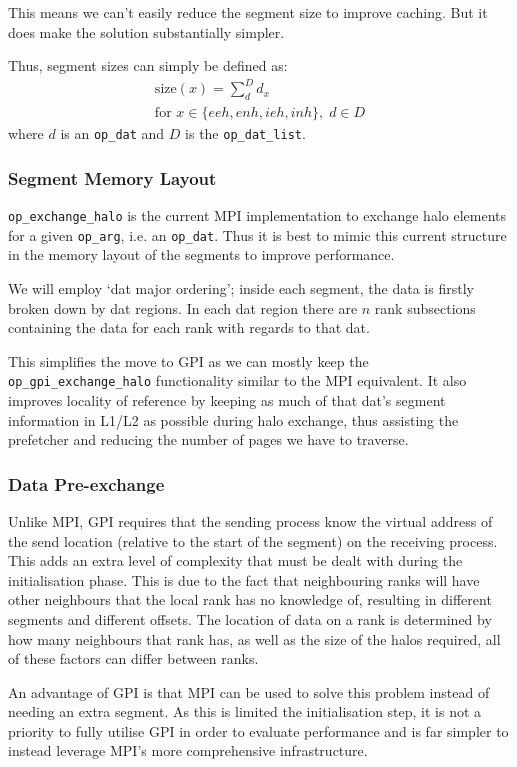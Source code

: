 This means we can't easily reduce the segment size to improve caching. But it does make the solution substantially simpler.

Thus, segment sizes can simply be defined as:
\begin{gather*}
\text{size}(x) = \sum_{d}^D d_x\\
\text{for } x \in \{eeh,enh,ieh,inh\},\;d \in D
\end{gather*}
where $d$ is an \texttt{op\_dat} and $D$ is the \texttt{op\_dat\_list}.
\subsubsection{Segment Memory Layout}

\texttt{op\_exchange\_halo} is the current MPI implementation to exchange halo elements for a given \texttt{op\_arg}, i.e. an \texttt{op\_dat}. Thus it is best to mimic this current structure in the memory layout of the segments to improve performance. 

We will employ `dat major ordering'; inside each segment, the data is firstly broken down by dat regions. In each dat region there are $n$ rank subsections containing the data for each rank with regards to that dat.  

This simplifies the move to GPI as we can mostly keep the \texttt{op\_gpi\_exchange\_halo} functionality similar to the MPI equivalent. It also improves locality of reference by keeping as much of that dat's segment information in L1/L2 as possible during halo exchange, thus assisting the prefetcher and reducing the number of pages we have to traverse.

\subsubsection{Data Pre-exchange}
Unlike MPI, GPI requires that the sending process know the virtual address of the send location (relative to the start of the segment) on the receiving process. This adds an extra level of complexity that must be dealt with during the initialisation phase. This is due to the fact that neighbouring ranks will have other neighbours that the local rank has no knowledge of, resulting in different segments and different offsets. The location of data on a rank is determined by how many neighbours that rank has, as well as the size of the halos required, all of these factors can differ between ranks.

An advantage of GPI is that MPI can be used to solve this problem instead of needing an extra segment. As this is limited the initialisation step, it is not a priority to fully utilise GPI in order to evaluate performance and is far simpler to instead leverage MPI's more comprehensive infrastructure. %

